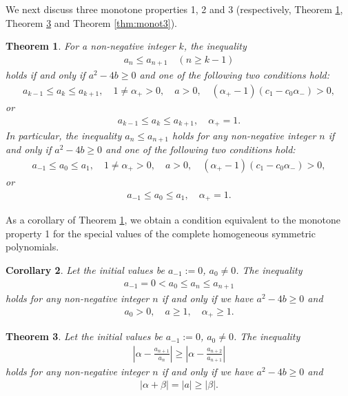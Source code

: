 \documentclass[a4paper,11pt,reqno]{amsart}
\theoremstyle{plain}
\newtheorem{thm}{Theorem}[section]
\newtheorem{cor}[thm]{Corollary}
\theoremstyle{definition}
\begin{document}
We next discuss three monotone properties 1, 2 and 3 (respectively, Theorem \ref{thm:monot1}, Theorem \ref{thm:monot2} and Theorem \ref{thm:monot3}).
\begin{thm}
\label{thm:monot1}
For a non-negative integer $k$, 
the inequality 
\begin{align}
\label{eq:monot1-k}
a_{n}\leq a_{n+1} \quad (n\geq k-1)
\end{align}
holds if and only if $a^{2}-4b\geq 0$ and one of the following two conditions hold: 
\begin{align}
\label{eq:cond1}
a_{k-1}\leq a_{k}\leq a_{k+1}, \quad 1\not=\alpha _{+}>0,\quad a>0, \quad (\alpha _{+}-1)(c_{1}-c_{0}\alpha _{-})> 0,
\end{align}
or 
\begin{align}
\label{eq:cond1 another}
a_{k-1}\leq a_{k}\leq a_{k+1}, \quad \alpha _{+}=1.
\end{align}
In particular, the inequality $a_{n}\leq a_{n+1}$ holds for any non-negative integer $n$ 
if and only if $a^{2}-4b\geq 0$ and one of the following two conditions hold: 
\begin{align}
\label{eq:cond1 monot}
a_{-1}\leq a_{0}\leq a_{1}, \quad 1\not=\alpha _{+}>0,\quad a>0, \quad (\alpha _{+}-1)(c_{1}-c_{0}\alpha _{-})> 0,
\end{align}
or
\begin{align}
\label{eq:cond1 another monot}
a_{-1}\leq a_{0}\leq a_{1}, \quad \alpha _{+}=1.
\end{align}
\end{thm}

As a corollary of Theorem \ref{thm:monot1}, we obtain 
a condition equivalent to 
the monotone property 1 
for the special values of the complete homogeneous symmetric polynomials. 
\begin{cor}
\label{cor:monot1}
Let the initial values be $a_{-1}:=0$, $a_{0}\not=0$. 
The inequality 
\begin{align}
\label{eq:monot1}
a_{-1}=0< a_{0}\leq a_{n}\leq a_{n+1}
\end{align}
holds for any non-negative integer $n$ if and only if
we have $a^{2}-4b \geq 0$ and 
\begin{align}
\label{eq:cond1 cor}
a_{0}>0, \quad 
a\geq 1, \quad 
\alpha _{+}\geq 1.
\end{align}
\end{cor}

\begin{thm}
\label{thm:monot2}
Let the initial values be $a_{-1}:=0$, $a_{0}\not=0$. 
The inequality 
\begin{align}
\label{eq:monot2-2}
\left|\alpha -\frac{a_{n+1}}{a_{n}}\right| \geq \left|\alpha -\frac{a_{n+2}}{a_{n+1}}\right|
\end{align}
holds for any non-negative integer $n$ if and only if
we have $a^{2}-4b \geq 0$ and 
\begin{align}
\label{eq:cond2}
|\alpha +\beta |=|a|\geq |\beta |.
\end{align}
\end{thm}
\end{document}
